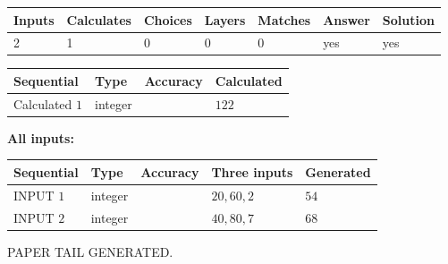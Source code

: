 \documentclass[12pt]{article}
\begin{document}
 
\noindent{}
 
 

 
   
   
   
   
\noindent\begin{tabular}{|l|l|l|l|l|l|l|}
 \hline
Inputs & Calculates & Choices & Layers & Matches & Answer & Solution \\ \hline
 2  & 
 1  & 
 0
  & 
 0  & 
 0  & 
  yes & 
  yes 
  \\ \hline
 \end{tabular}
   
   
   
   
\noindent{}
   
   
  
  
\noindent\begin{tabular}{|l|l|l|l|}
\hline
 Sequential & Type & Accuracy & Calculated \\ 
\hline
 
 
  Calculated $  1 $ & integer &  & 
  $ 122 $ 
 \\  \hline  
 \end{tabular}
   
   
   
   
\noindent\vspace{0.1in}\hspace{-0.08in} {\textbf{\Large{All inputs: }}}
   
   
  
  
\noindent\begin{tabular}{|l|l|l|l|l|}
\hline
 Sequential & Type & Accuracy & Three inputs & Generated \\ 
\hline
 
 
  INPUT $  1 $ & integer &  & $
 20
 , 
 60
 , 
 2
 $ & $ 54 $ 
 \\  \hline  
 
 
  INPUT $  2 $ & integer &  & $
 40
 , 
 80
 , 
 7
 $ & $ 68 $ 
 \\  \hline  
 \end{tabular}
   
   
   
   
   
   
 \vspace{0.2in}
 
   
   
\vspace{2.0in} PAPER TAIL GENERATED.
   
\end{document}
